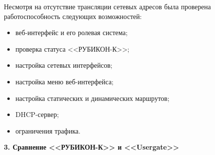 Несмотря на отсутствие трансляции сетевых адресов была проверена работоспособность следующих возможностей:
\begin{itemize}
	\item веб-интерфейс и его ролевая система;
	
	\item проверка статуса <<РУБИКОН-К>>;
	
	\item настройка сетевых интерфейсов;
	
	\item настройка меню веб-интерфейса;
	
	\item настройка статических и динамических маршрутов;
	
	\item DHCP-сервер;
	
	\item ограничения трафика.
\end{itemize}

\newpage

\begin{center}
	\textbf{\Large 3. Сравнение <<РУБИКОН-К>> и <<Usergate>>}
\end{center}

